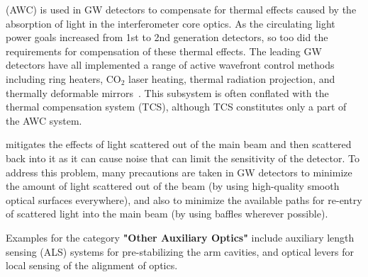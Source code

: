  (AWC) is used in GW detectors to compensate for thermal effects caused by the absorption of light in the interferometer core optics. As the circulating light power goals increased from 1st to 2nd generation detectors, so too did the requirements for compensation of these thermal effects. The leading GW detectors have all implemented a range of active wavefront control methods including ring heaters, CO$_2$ laser heating, thermal radiation projection, and thermally deformable mirrors~\cite{aLIGO_AWC, AdVirgo_IO}. This subsystem is often conflated with the thermal compensation system (TCS), although TCS constitutes only a part of the AWC system. 

mitigates the effects of light scattered out of the main beam and then scattered back into it as it can cause noise that can limit the sensitivity of the detector.
To address this problem, many precautions are taken in GW detectors to minimize the amount of light scattered out of the beam (by using high-quality smooth optical surfaces everywhere), and also to minimize the available paths for re-entry of scattered light into the main beam (by using baffles wherever possible). 

\noindent 
Examples for the category {\bf "Other Auxiliary Optics"} include 
auxiliary length sensing (ALS) systems for pre-stabilizing the arm cavities, and optical levers for local sensing of the alignment of optics.


